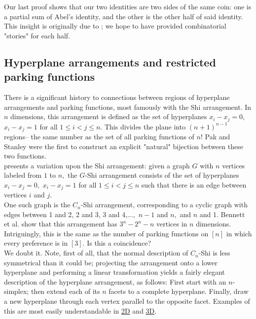 Our last proof shows that our two identities are two sides of the same coin: one is a partial sum of Abel's identity, and the other is the other half of said identity. This insight is originally due to \cite{cameron-johannsen-prellberg-schweitzer-2008}; we hope to have provided combinatorial "stories" for each half.

\subsection*{Hyperplane arrangements and restricted parking functions}

There is a significant history to connections between regions of hyperplane arrangements and parking functions, most famously with the Shi arrangement. In $n$ dimensions, this arrangement is defined as the set of hyperplanes $x_i-x_j=0,$ $x_i-x_j=1$ for all $1\le i<j\le n.$ This divides the plane into $(n+1)^{n-1}$ regions-- the same number as the set of all parking functions of $n$! Pak and Stanley were the first to construct an explicit "natural" bijection between these two functions.\\

\cite{bennett-2024} presents a variation upon the Shi arrangement: given a graph $G$ with $n$ vertices labeled from $1$ to $n,$ the $G$-Shi arrangement consists of the set of hyperplanes $x_i-x_j=0,$ $x_i-x_j=1$ for all $1\le i<j\le n$ such that there is an edge between vertices $i$ and $j.$\\

One such graph is the $C_n$-Shi arrangement, corresponding to a cyclic graph with edges between 1 and 2, 2 and 3, 3 and 4,$\ldots,$ $n-1$ and $n,$ and $n$ and 1. Bennett et al. show that this arrangement has $3^n-2^n-n$ vertices in $n$ dimensions. Intriguingly, this is the same as the number of parking functions on $[n]$ in which every preference is in $[3].$ Is this a coincidence?\\

We doubt it. Note, first of all, that the normal description of $C_n$-Shi is less symmetrical than it could be; projecting the arrangement onto a lower hyperplane and performing a linear transformation yields a fairly elegant description of the hyperplane arrangement, as follows: First start with an $n$-simplex; then extend each of its $n$ facets to a complete hyperplane. Finally, draw a new hyperplane through each vertex parallel to the opposite facet. Examples of this are most easily understandable in \href{https://www.desmos.com/calculator/0vsgpofrj4}{2D} and \href{https://www.desmos.com/3d/cwyqh9kied}{3D}.\\

